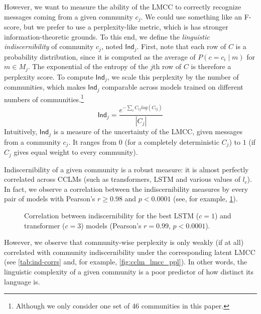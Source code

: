 \documentclass[11pt,a4paper]{article}
\newcommand\Ind{\mathsf{Ind}}
\begin{document}
\begin{figure*}
\caption{LMCC confusion matrices for the best LSTM (left, $c=1$) and transformer (right, $c=3$) models.}
\label{fig:confusion}
\end{figure*}

However, we want to measure the ability of the LMCC to correctly
recognize messages coming from a given community $c_j$. We could use
something like an F-score, but we prefer to use a perplexity-like metric,
which is has stronger information-theoretic grounds.
To this end, we define the \emph{linguistic indiscernibility} of community $c_j$, 
noted $\Ind_j$. 
First, note that each row of $C$ is a probability distribution,
since it is computed as the average of $P(c=c_i \mid m)$ for $m\in M_j$.
The exponential of the entropy of the $j$th row of \(C\) is therefore a perplexity score.
To compute $\Ind_j$, we scale this perplexity by the number of communities, 
which makes $\Ind_j$ comparable across models trained on different
numbers of communities.\footnote{Although we only consider one set of \num{46} communities in this paper.}
\[\Ind_j = \frac{e^{-\sum_i C_{ij} log(C_{ij})}}{|C_j|}\]
Intuitively, $\Ind_j$ is a measure of the uncertainty of the LMCC,
given messages from a community $c_j$.
It ranges from $0$ (for a completely deterministic $C_j$) 
to $1$ (if $C_j$ gives equal weight to every community).

Indiscernibility of a given community is a robust measure: it is
almost perfectly correlated across CCLMs (such as transformers, LSTM
and various values of $l_c$).  In fact, we observe a correlation
between the indiscernibility measures by every pair of models with
Pearson's $r \geq 0.98$ and $p < 0.0001$ (see, for example,
\cref{fig:lmcc_ppl}).

\begin{figure}
  \caption{%
    Correlation between indiscernibility for the best LSTM ($c = 1$) and transformer ($c = 3$) models
    (Pearson's $r = 0.99$, $p < 0.0001$).
  }
  \label{fig:lmcc_ppl}
\end{figure}

However, we observe that community-wise perplexity is only weakly (if at all) 
correlated with community indiscernibility under the corresponding latent 
LMCC (see \cref{tab:ind-corrs} and, for example, \cref{fig:cclm_lmcc_ppl}).
In other words, the linguistic complexity of a given community
is a poor predictor of how distinct its language is.
\end{document}
